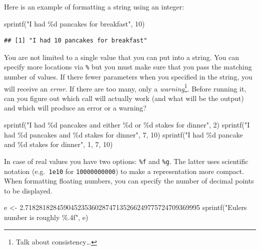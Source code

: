 \documentclass[
]{book}
\newenvironment{Shaded}{\begin{snugshade}}{\end{snugshade}}
\newcommand{\DecValTok}[1]{\textcolor[rgb]{0.00,0.00,0.81}{#1}}
\newcommand{\FloatTok}[1]{\textcolor[rgb]{0.00,0.00,0.81}{#1}}
\newcommand{\FunctionTok}[1]{\textcolor[rgb]{0.00,0.00,0.00}{#1}}
\newcommand{\NormalTok}[1]{#1}
\newcommand{\OtherTok}[1]{\textcolor[rgb]{0.56,0.35,0.01}{#1}}
\newcommand{\StringTok}[1]{\textcolor[rgb]{0.31,0.60,0.02}{#1}}
\begin{document}
Here is an example of formatting a string using an integer:

\begin{Shaded}
\begin{Highlighting}[]
\FunctionTok{sprintf}\NormalTok{(}\StringTok{"I had \%d pancakes for breakfast"}\NormalTok{, }\DecValTok{10}\NormalTok{)}
\end{Highlighting}
\end{Shaded}

\begin{verbatim}
## [1] "I had 10 pancakes for breakfast"
\end{verbatim}

You are not limited to a single value that you can put into a string. You can specify more locations via \texttt{\%} but you must make sure that you pass the matching number of values. If there fewer parameters when you specified in the string, you will receive an \emph{error}. If there are too many, only a \emph{warning}\footnote{Talk about consistency\ldots{}}. Before running it, can you figure out which call will actually work (and what will be the output) and which will produce an error or a warning?

\begin{Shaded}
\begin{Highlighting}[]
\FunctionTok{sprintf}\NormalTok{(}\StringTok{"I had \%d pancakes and either \%d  or \%d stakes for dinner"}\NormalTok{, }\DecValTok{2}\NormalTok{)}
\FunctionTok{sprintf}\NormalTok{(}\StringTok{"I had \%d pancakes and \%d stakes for dinner"}\NormalTok{, }\DecValTok{7}\NormalTok{, }\DecValTok{10}\NormalTok{)}
\FunctionTok{sprintf}\NormalTok{(}\StringTok{"I had \%d pancake and \%d stakes for dinner"}\NormalTok{, }\DecValTok{1}\NormalTok{, }\DecValTok{7}\NormalTok{, }\DecValTok{10}\NormalTok{)}
\end{Highlighting}
\end{Shaded}

In case of real values you have two options: \texttt{\%f} and \texttt{\%g}. The latter uses scientific notation (e.g.~\texttt{1e10} for \texttt{10000000000}) to make a representation more compact. When formatting floating numbers, you can specify the number of decimal points to be displayed.

\begin{Shaded}
\begin{Highlighting}[]
\NormalTok{e }\OtherTok{\textless{}{-}} \FloatTok{2.71828182845904523536028747135266249775724709369995}
\FunctionTok{sprintf}\NormalTok{(}\StringTok{"Euler\textquotesingle{}s number is roughly \%.4f"}\NormalTok{, e)}
\end{Highlighting}
\end{Shaded}
\end{document}
